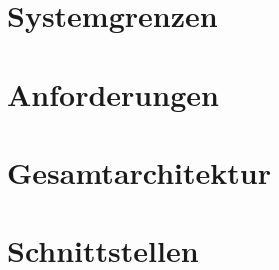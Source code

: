 
\section{Systemgrenzen}

\section{Anforderungen}

\section{Gesamtarchitektur}

\section{Schnittstellen}